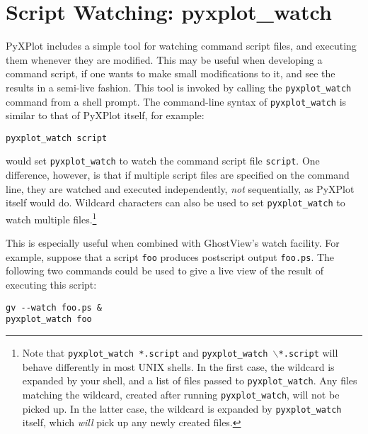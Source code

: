 \section{Script Watching: pyxplot\_watch}

PyXPlot includes a simple tool for watching command script files, and executing
them whenever they are modified. This may be useful when developing a command
script, if one wants to make small modifications to it, and see the results in
a semi-live fashion. This tool is invoked by calling the
\texttt{pyxplot\_watch} command
from a shell prompt. The command-line syntax of \texttt{pyxplot\_watch} is
similar to that of PyXPlot itself, for example:

\begin{verbatim}
pyxplot_watch script
\end{verbatim}

\noindent would set \texttt{pyxplot\_watch} to watch the command script file
\texttt{script}. One difference, however, is that if multiple script files are
specified on the command line, they are watched and executed independently,
\textit{not} sequentially, as PyXPlot itself would do. Wildcard characters can
also be used to set \texttt{pyxplot\_watch} to watch multiple
files.\footnote{Note that \texttt{pyxplot\_watch *.script} and
\texttt{pyxplot\_watch $\backslash$*.script} will behave differently in most
UNIX shells.  In the first case, the wildcard is expanded by your shell, and a
list of files passed to \texttt{pyxplot\_watch}. Any files matching the
wildcard, created after running \texttt{pyxplot\_watch}, will not be picked up.
In the latter case, the wildcard is expanded by \texttt{pyxplot\_watch} itself,
which \textit{will} pick up any newly created files.}

This is especially useful when combined with GhostView's watch facility. For
example, suppose that a script \texttt{foo} produces postscript output
\texttt{foo.ps}. The following two commands could be used to give a live view
of the result of executing this script:

\begin{verbatim}
gv --watch foo.ps &
pyxplot_watch foo
\end{verbatim}

